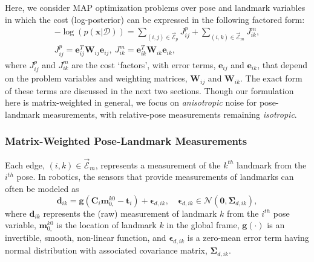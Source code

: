 \documentclass[lettersize,journal]{IEEEtran}
\newcommand{\EdgeSet}{\vec{\bm{\mathcal{E}}}}
\begin{document}
Here, we consider MAP optimization problems over pose and landmark variables in which the cost (log-posterior) can be expressed in the following factored form\cite{barfootStateEstimationRobotics2017}:
\begin{equation}\label{eqn:factor_graph}
	\begin{gathered}
		-\log\left(p(\bm{x} \vert \bm{\mathcal{D}})\right) = \sum\limits_{(i,j)\in\EdgeSet_p}  J_{ij}^{p} + \sum\limits_{(i,k)\in\EdgeSet_m} J_{ik}^{m}, \\ 
		J_{ij}^{p} = \bm{e}_{ij}^T \bm{W}_{ij} \bm{e}_{ij}, ~J_{ik}^{m} = \bm{e}_{ik}^T \bm{W}_{ik} \bm{e}_{ik},
	\end{gathered}
\end{equation}
where $J_{ij}^{p}$ and $J_{ik}^{m}$ are the cost `factors', with error terms, $\bm{e}_{ij}$ and $\bm{e}_{ik}$, that depend on the problem variables and weighting matrices, $\bm{W}_{ij}$ and $\bm{W}_{ik}$. 
The exact form of these terms are discussed in the next two sections. Though our formulation here is matrix-weighted in general, we focus on \emph{anisotropic} noise for pose-landmark measurements, with relative-pose measurements remaining \emph{isotropic}.

\subsubsection{Matrix-Weighted Pose-Landmark Measurements}\label{sec:LandmarkMeas}

Each edge, $(i,k) \in \EdgeSet_m $, represents a measurement of the $k^{th}$ landmark from the $i^{th}$ pose. In robotics, the sensors that provide measurements of landmarks can often be modeled as
\begin{equation}
	\bm{d}_{ik} = \bm{g}(\bm{C}_i\bm{m}_{0,}^{k0} - \bm{t}_i) + \bm{\epsilon}_{d,ik}, \quad \bm{\epsilon}_{d,ik} \in \mathcal{N}(\bm{0},\bm{\Sigma}_{d,ik}),
\end{equation}
where $ \bm{d}_{ik} $ represents the (raw) measurement of landmark $k$ from the $i^{th}$ pose variable, $\bm{m}_{0,}^{k0}$ is the location of landmark $k$ in the global frame, $ \bm{g}(\cdot) $ is an invertible, smooth, non-linear function, and $ \bm{\epsilon}_{d,ik} $ is a zero-mean error term having normal distribution with associated covariance matrix, $ \bm{\Sigma}_{d,ik} $. 
\end{document}
